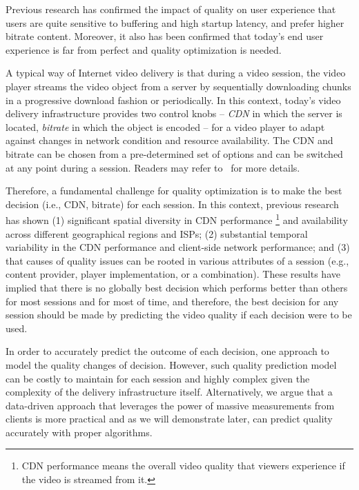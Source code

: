 




 Previous research has confirmed the impact of quality on user experience that users are quite sensitive to buffering and high startup latency, and prefer higher bitrate content. Moreover, it also has been confirmed that today's end user experience is far from perfect and quality optimization is needed\cite{sigcomm12,conext13}.

 A typical way of Internet video delivery is that during a video session, the video player streams the video object from a server by sequentially downloading chunks in a progressive download fashion or periodically. In this context, today's video delivery infrastructure provides two control knobs -- {\it CDN} in which the server is located, {\it bitrate} in which the object is encoded -- for a video player to adapt against changes in network condition and resource availability. The CDN and bitrate can be chosen from a pre-determined set of options and can be switched at any point during a session. Readers may refer to~\cite{conext12} for more details. 

 Therefore, a fundamental challenge for quality optimization is to make the best decision (i.e., CDN, bitrate) for each session. In this context, previous research \cite{sigcomm12,conext13} has shown (1) significant spatial diversity in CDN performance \footnote{CDN performance means the overall video quality that viewers experience if the video is streamed from it.} and availability across different geographical regions and ISPs; (2) substantial temporal variability in the CDN performance and client-side network performance; and (3) that causes of quality issues can be rooted in various attributes of a session (e.g., content provider, player implementation, or a combination). These results have implied that there is no globally best decision which performs better than others for most sessions and for most of time, and therefore, the best decision for any session should be made by predicting the video quality if each decision were to be used. 

 In order to accurately predict the outcome of each decision, one approach to model the quality changes of decision. However, such quality prediction model can be costly to maintain for each session and highly complex given the complexity of the delivery infrastructure itself. Alternatively, we argue that a data-driven approach that leverages the power of massive measurements from clients is more practical and as we will demonstrate later, can predict quality accurately with proper algorithms.

